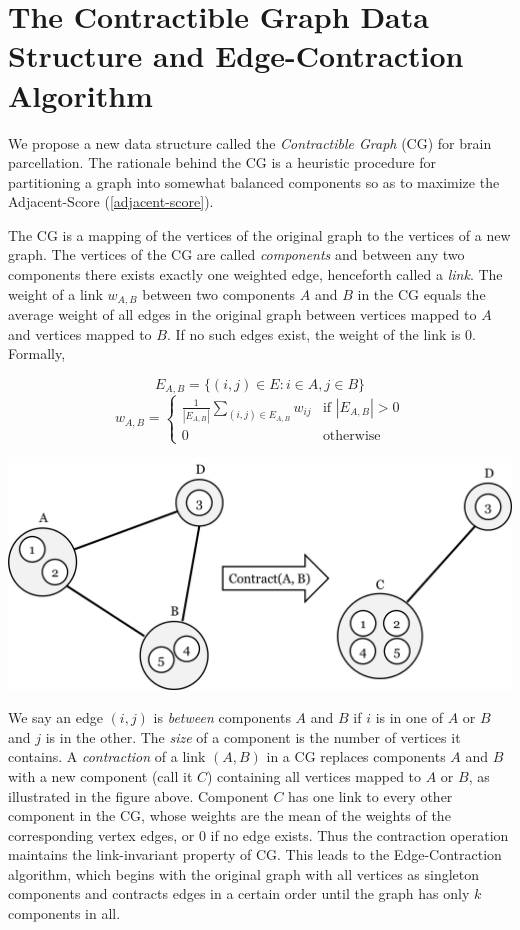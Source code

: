 \section{The Contractible Graph Data Structure and
Edge-Contraction Algorithm}

We propose a new data structure called the \textit{Contractible Graph}
(CG) for brain parcellation. The rationale behind the CG is a heuristic
procedure for partitioning a graph into somewhat balanced components
so as to maximize the Adjacent-Score (\ref{adjacent-score}).

The CG is a mapping of the vertices of the original graph to the
vertices of a new graph. The vertices of the CG are called
\textit{components} and between any two components there exists exactly
one weighted edge, henceforth called a \textit{link}. The weight
of a link $w_{A,B}$ between two components $A$ and $B$ in the CG equals
the average weight of all edges in the original graph between vertices
mapped to $A$ and vertices mapped to $B$. If no such edges exist,
the weight of the link is $0$. Formally,

\[ E_{A,B} = \{(i, j) \in E : i \in A, j \in B\} \]
\[ w_{A,B} = \begin{cases}
    \frac{1}{|E_{A,B}|} \sum_{(i,j) \in E_{A,B}} w_{ij} &
        \text{if } |E_{A,B}| > 0 \\
    0 & \text{otherwise}
\end{cases} \]

\includegraphics[scale = 0.5]{figs/4_contractible_graph}

We say an edge $(i,j)$ is \textit{between} components $A$ and $B$ if
$i$ is in one of $A$ or $B$ and $j$ is in the other. The \textit{size}
of a component is the number of vertices it contains.
A \textit{contraction} of a link $(A,B)$ in a CG replaces components
$A$ and $B$ with a new component (call it $C$) containing all vertices
mapped to $A$ or $B$, as illustrated in the figure above.
Component $C$ has one link to every other component in the CG, whose
weights are the mean of the weights of the corresponding vertex edges,
or $0$ if no edge exists. Thus the contraction operation maintains the
link-invariant property of CG. This leads to the Edge-Contraction
algorithm, which begins with the original graph with all vertices as
singleton components and contracts edges in a certain order until the
graph has only $k$ components in all.

